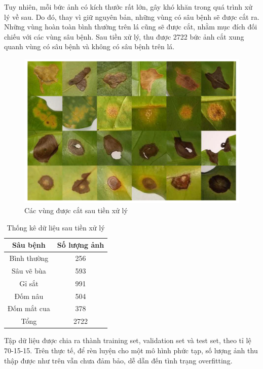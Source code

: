 \documentclass[a4paper,14pt]{extarticle}
\begin{document}
	Tuy nhiên, mỗi bức ảnh có kích thước rất lớn, gây khó khăn trong quá trình xử lý về sau. Do đó, thay vì giữ nguyên bản, những vùng có sâu bệnh sẽ được cắt ra. Những vùng hoàn toàn bình thường trên lá cũng sẽ được cắt, nhằm mục đích đối chiếu với các vùng sâu bệnh. Sau tiền xử lý, thu được 2722 bức ảnh cắt xung quanh vùng có sâu bệnh và không có sâu bệnh trên lá.
	
	\begin{figure}[H]
		\centering
		\includegraphics[scale=0.4]{images/image3}
		\caption{Các vùng được cắt sau tiền xử lý}
	\end{figure}

	\begin{table}[H]
		\centering
		\begin{tabular}{|c|c|}
		\hline
		Sâu bệnh        & Số lượng ảnh \\ \hline
		Bình thường & 256          \\
		Sâu vẽ bùa  & 593          \\
		Gỉ sắt      & 991          \\
		Đốm nâu     & 504          \\
		Đốm mắt cua & 378          \\ \hline
		Tổng        & 2722         \\ \hline
		\end{tabular}

		\caption{Thống kê dữ liệu sau tiền xử lý}
	\end{table}

	Tập dữ liệu được chia ra thành training set, validation set và test set, theo tỉ lệ 70-15-15. Trên thực tế, để rèn luyện cho một mô hình phức tạp, số lượng ảnh thu thập được như trên vẫn chưa đảm bảo, dễ dẫn đến tình trạng overfitting.
\end{document}
